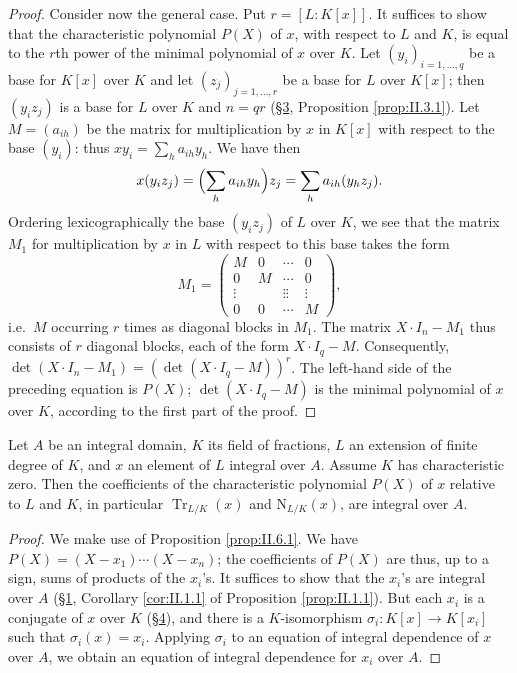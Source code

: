 \begin{proof}
Consider now the general case. Put $r=[L:K[x]]$. It suffices to show that
the characteristic polynomial $P(X)$ of $x$, with respect to $L$ and $K$, is
equal to the $r$th power of the minimal polynomial of $x$ over $K$. Let
$(y_{i})_{i=1,\ldots,q}$ be a base for $K[x]$ over $K$ and let
$(z_{j})_{j=1,\ldots,r}$ be a base for $L$ over $K[x]$; then $(y_{i}z_{j})$
is a base for $L$ over $K$ and $n=qr$ (\hyperref[sec:2.3]{§3}, Proposition \ref{prop:II.3.1}).
Let $M=(a_{ih})$ be the matrix for multiplication by $x$ in $K[x]$ with
respect to the base $(y_{i})$: thus $xy_{i}=\sum_{h}a_{ih}y_{h}$. We have
then
\[
x(y_{i}z_{j})=\Bigl(\sum_{h}a_{ih}y_{h}\Bigr)z_{j}
=\sum_{h}a_{ih}(y_{h}z_{j}).
\]
Ordering lexicographically the base $(y_{i}z_{j})$ of $L$ over $K$, we see
that the matrix $M_{1}$ for multiplication by $x$ in $L$ with respect to
this base takes the form
\[
M_{1}=\begin{pmatrix}
M&0&\cdots&0\\
0&M&\cdots&0\\
\vdots&&\vdots\vdots&\vdots\\
0&0&\cdots&M
\end{pmatrix},
\]
i.e.\ $M$ occurring $r$ times as diagonal blocks in $M_{1}$. The matrix
$X\cdot I_{n}-M_{1}$ thus consists of $r$ diagonal blocks, each of the form
$X\cdot I_{q}-M$. Consequently,
$\det(X\cdot I_{n}-M_{1})=(\det(X\cdot I_{q}-M))^{r}$. The left-hand side of
the preceding equation is $P(X)$; $\det(X\cdot I_{q}-M)$ is the minimal
polynomial of $x$ over $K$, according to the first part of the proof.
\end{proof}

\begin{proposition}
\label{prop:II.6.2}
Let $A$ be an integral domain, $K$ its field of fractions, $L$ an extension
of finite degree of $K$, and $x$ an element of $L$ integral over $A$. Assume
$K$ has characteristic zero. Then the coefficients of the characteristic
polynomial $P(X)$ of $x$ relative to $L$ and $K$, in particular
$\operatorname{Tr}_{L/K}(x)$ and $\mathrm{N}_{L/K}(x)$, are integral over
$A$.
\end{proposition}

\begin{proof}
We make use of Proposition \ref{prop:II.6.1}. We have
$P(X)=(X-x_{1})\cdots(X-x_{n})$; the coefficients of $P(X)$ are thus, up to a
sign, sums of products of the $x_{i}$'s. It suffices to show that the
$x_{i}$'s are integral over $A$ (\hyperref[sec:2.1]{§1}, Corollary \ref{cor:II.1.1} of
Proposition \ref{prop:II.1.1}). But each $x_{i}$ is a conjugate of $x$ over
$K$ (\hyperref[sec:2.4]{§4}), and there is a $K$-isomorphism
$\sigma_{i}:K[x]\to K[x_{i}]$ such that $\sigma_{i}(x)=x_{i}$. Applying
$\sigma_{i}$ to an equation of integral dependence of $x$ over $A$, we
obtain an equation of integral dependence for $x_{i}$ over $A$.
\end{proof}

